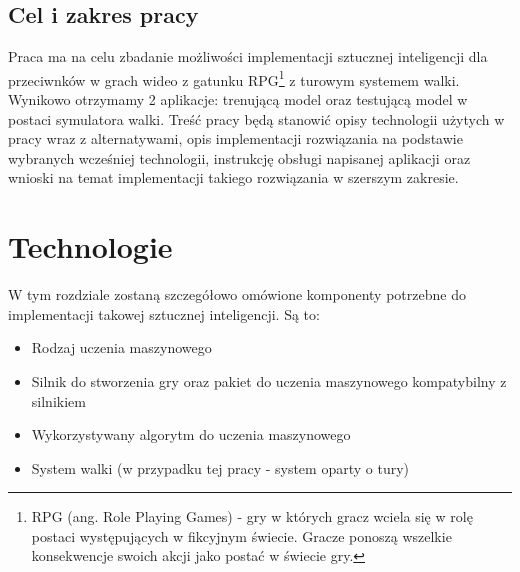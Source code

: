 \documentclass{SGGW-thesis}
\begin{document}
\section{Cel i zakres pracy}
Praca ma na celu zbadanie możliwości implementacji sztucznej inteligencji dla przeciwnków w grach wideo z gatunku RPG\footnote{RPG (ang. Role Playing Games) 
- gry w których gracz wciela się w rolę postaci występujących w fikcyjnym świecie. Gracze ponoszą wszelkie konsekwencje swoich akcji jako postać w świecie gry.}
z turowym systemem walki. Wynikowo otrzymamy 2 aplikacje: trenującą model oraz testującą model w postaci symulatora walki. Treść pracy będą stanowić opisy technologii
użytych w pracy wraz z alternatywami, opis implementacji rozwiązania na podstawie wybranych wcześniej technologii, instrukcję obsługi napisanej aplikacji oraz
wnioski na temat implementacji takiego rozwiązania w szerszym zakresie.


\chapter{Technologie}
W tym rozdziale zostaną szczegółowo omówione komponenty potrzebne do implementacji takowej sztucznej inteligencji. Są to: 
\begin{itemize}
  \item{Rodzaj uczenia maszynowego}
  \item{Silnik do stworzenia gry oraz pakiet do uczenia maszynowego kompatybilny z silnikiem}
  \item{Wykorzystywany algorytm do uczenia maszynowego}
  \item{System walki (w przypadku tej pracy - system oparty o tury)}
\end{itemize}
\end{document}
